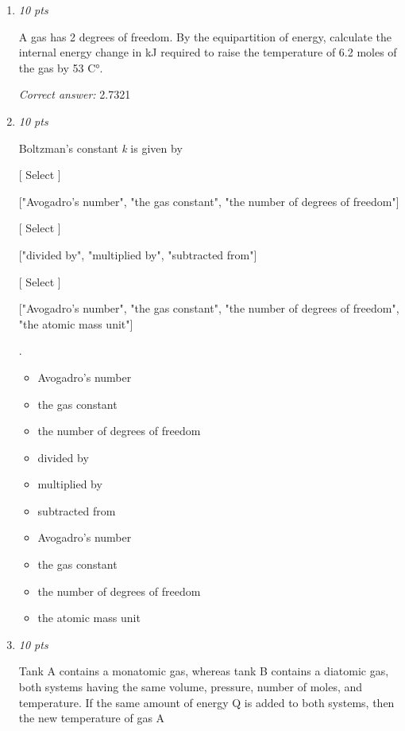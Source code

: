 \documentclass[11pt]{article}
\begin{document}
\begin{enumerate}[leftmargin=*,label=\textbf{Question \arabic*.}]
Calculate the total internal energy in kJ of 2.4 mol of helium gas at a temperature of 155°C.



\emph{E}= \rule{2.5cm}{0.4pt} kJ

\textit{Correct answer:} 12.811

\item \hfill \textit{10 pts}

A gas has 2 degrees of freedom. By the equipartition of energy, calculate the internal energy change in kJ required to raise the temperature of 6.2 moles of the gas by 53 C°.

\textit{Correct answer:} 2.7321

\item \hfill \textit{10 pts}

Boltzman's constant \emph{k} is given by

    [ Select ]

  ["Avogadro's number", "the gas constant", "the number of degrees of freedom"]



    [ Select ]

  ["divided by", "multiplied by", "subtracted from"]



    [ Select ]

  ["Avogadro's number", "the gas constant", "the number of degrees of freedom", "the atomic mass unit"]

.

\begin{itemize}
  \item Avogadro's number
  \item the gas constant
  \item the number of degrees of freedom
  \item divided by
  \item multiplied by
  \item subtracted from
  \item Avogadro's number
  \item the gas constant
  \item the number of degrees of freedom
  \item the atomic mass unit
\end{itemize}

\item \hfill \textit{10 pts}

Tank A contains a monatomic gas, whereas tank B contains a diatomic gas, both systems having the same volume, pressure, number of moles, and temperature. If the same amount of energy Q is added to both systems, then the new temperature of gas A


\end{enumerate}
\end{document}
